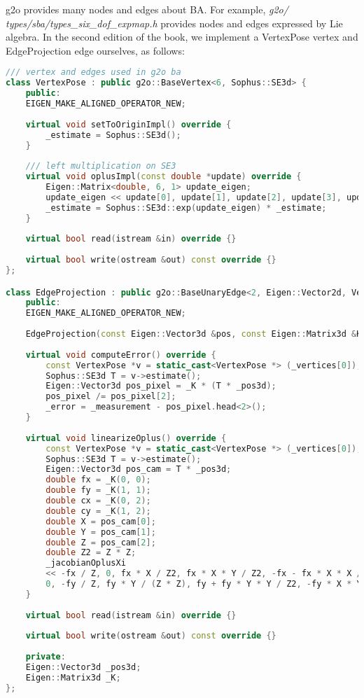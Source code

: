 g2o provides many nodes and edges about BA. For example, \textit{g2o/\\types/sba/types\_six\_dof\_expmap.h} provides nodes and edges expressed by Lie algebra. In the second edition of the book, we implement a VertexPose vertex and EdgeProjection edge ourselves, as follows:
\begin{lstlisting}[language=c++,caption=slambook2/ch7/pose_estimation_3d2d.cpp (part)]
/// vertex and edges used in g2o ba
class VertexPose : public g2o::BaseVertex<6, Sophus::SE3d> {
	public:
	EIGEN_MAKE_ALIGNED_OPERATOR_NEW;
	
	virtual void setToOriginImpl() override {
		_estimate = Sophus::SE3d();
	}
	
	/// left multiplication on SE3
	virtual void oplusImpl(const double *update) override {
		Eigen::Matrix<double, 6, 1> update_eigen;
		update_eigen << update[0], update[1], update[2], update[3], update[4], update[5];
		_estimate = Sophus::SE3d::exp(update_eigen) * _estimate;
	}
	
	virtual bool read(istream &in) override {}
	
	virtual bool write(ostream &out) const override {}
};

class EdgeProjection : public g2o::BaseUnaryEdge<2, Eigen::Vector2d, VertexPose> {
	public:
	EIGEN_MAKE_ALIGNED_OPERATOR_NEW;
	
	EdgeProjection(const Eigen::Vector3d &pos, const Eigen::Matrix3d &K) : _pos3d(pos), _K(K) {}
	
	virtual void computeError() override {
		const VertexPose *v = static_cast<VertexPose *> (_vertices[0]);
		Sophus::SE3d T = v->estimate();
		Eigen::Vector3d pos_pixel = _K * (T * _pos3d);
		pos_pixel /= pos_pixel[2];
		_error = _measurement - pos_pixel.head<2>();
	}
	
	virtual void linearizeOplus() override {
		const VertexPose *v = static_cast<VertexPose *> (_vertices[0]);
		Sophus::SE3d T = v->estimate();
		Eigen::Vector3d pos_cam = T * _pos3d;
		double fx = _K(0, 0);
		double fy = _K(1, 1);
		double cx = _K(0, 2);
		double cy = _K(1, 2);
		double X = pos_cam[0];
		double Y = pos_cam[1];
		double Z = pos_cam[2];
		double Z2 = Z * Z;
		_jacobianOplusXi
		<< -fx / Z, 0, fx * X / Z2, fx * X * Y / Z2, -fx - fx * X * X / Z2, fx * Y / Z,
		0, -fy / Z, fy * Y / (Z * Z), fy + fy * Y * Y / Z2, -fy * X * Y / Z2, -fy * X / Z;
	}
	
	virtual bool read(istream &in) override {}
	
	virtual bool write(ostream &out) const override {}
	
	private:
	Eigen::Vector3d _pos3d;
	Eigen::Matrix3d _K;
};
\end{lstlisting}

